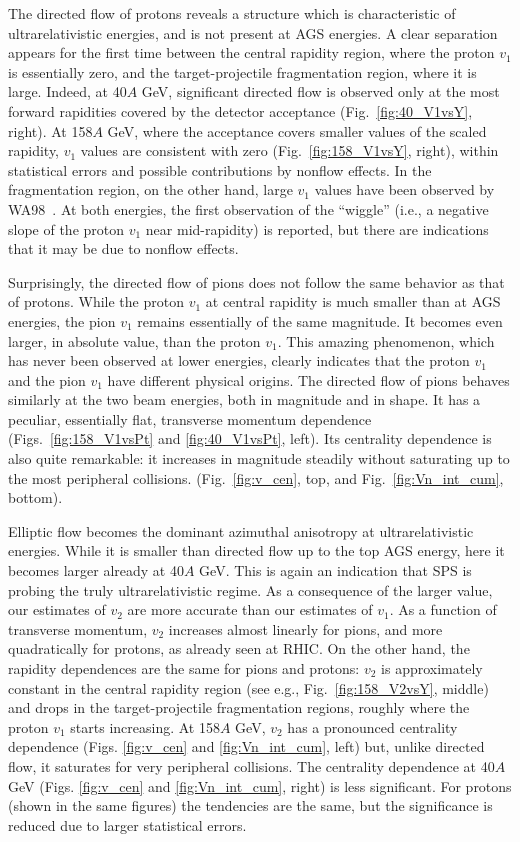 \documentclass[aps,prc,superscriptaddress,showpacs,floatfix,nofootinbib]{revtex4}
\begin{document}
The directed flow of protons reveals a structure which is
characteristic of ultrarelativistic energies, and is not present at
AGS energies. A clear separation appears for the first time between
the central rapidity region, where the proton $v_1$ is essentially
zero, and the target-projectile fragmentation region, where it is
large.  Indeed, at 40$A$ GeV, significant directed flow is
observed only at the most forward rapidities covered by the detector
acceptance (Fig.~\ref{fig:40_V1vsY}, right).  At 158$A$ GeV,
where the acceptance covers smaller values of the scaled rapidity,
$v_1$ values are consistent with zero (Fig.~\ref{fig:158_V1vsY},
right), within statistical errors and possible contributions by
nonflow effects. In the fragmentation region, on the other hand, large
$v_1$ values have been observed by WA98~\cite{WA98:QM99}. At both
energies, the first observation of the ``wiggle'' (i.e., a negative
slope of the proton $v_1$ near mid-rapidity) is reported, but there
are indications that it may be due to nonflow effects.

Surprisingly, the directed flow of pions does not follow the same
behavior as that of protons.  While the proton $v_1$ at central
rapidity is much smaller than at AGS energies, the pion $v_1$ remains
essentially of the same magnitude.  It becomes even larger, in
absolute value, than the proton $v_1$.  This amazing phenomenon, which
has never been observed at lower energies, clearly indicates that the
proton $v_1$ and the pion $v_1$ have different physical origins.  The
directed flow of pions behaves similarly at the two beam energies,
both in magnitude and in shape.  It has a peculiar, essentially flat,
transverse momentum dependence (Figs.~\ref{fig:158_V1vsPt} and
\ref{fig:40_V1vsPt}, left).  Its centrality dependence is also quite
remarkable: it increases in magnitude steadily without saturating up
to the most peripheral collisions.  (Fig.~\ref{fig:v_cen}, top, and
Fig.~\ref{fig:Vn_int_cum}, bottom).

Elliptic flow becomes the dominant azimuthal anisotropy at
ultrarelativistic energies.  While it is smaller than directed flow up
to the top AGS energy, here it becomes larger already at
40$A$ GeV.  This is again an indication that SPS is probing the
truly ultrarelativistic regime.  As a consequence of the larger value,
our estimates of $v_2$ are more accurate than our estimates of $v_1$.
As a function of transverse momentum, $v_2$ increases almost linearly
for pions, and more quadratically for protons, as already seen at
RHIC.  On the other hand, the rapidity dependences are the same for
pions and protons: $v_2$ is approximately constant in the central
rapidity region (see e.g., Fig.~\ref{fig:158_V2vsY}, middle) and drops
in the target-projectile fragmentation regions, roughly where the
proton $v_1$ starts increasing.  At 158$A$ GeV, $v_2$ has a
pronounced centrality dependence (Figs. \ref{fig:v_cen} and
\ref{fig:Vn_int_cum}, left) but, unlike directed flow, it saturates
for very peripheral collisions.  The centrality dependence at 40$A$
GeV (Figs. \ref{fig:v_cen} and \ref{fig:Vn_int_cum}, right) is less
significant.  For protons (shown in the same figures) the tendencies
are the same, but the significance is reduced due to larger
statistical errors.
\end{document}
